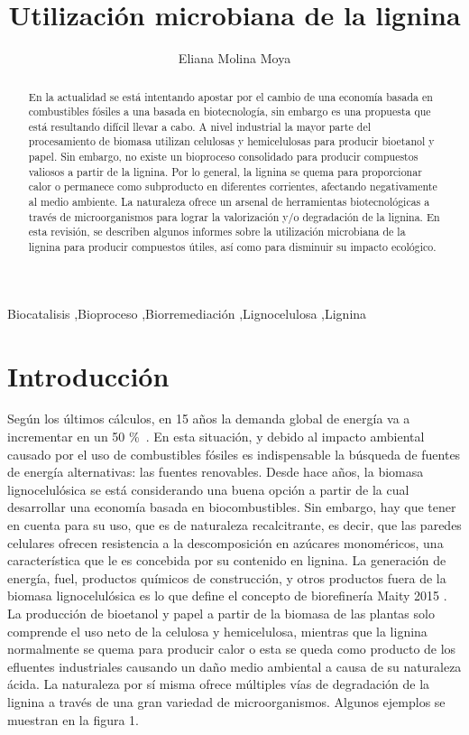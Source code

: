 \documentclass[final,a4paper,times,3p,onecolumn]{elsarticle}
\begin{document}
\begin{frontmatter}	
\title{Utilización microbiana de la lignina}
\author[deg]{Eliana Molina Moya}
\address[deg]{Universidad de Granada}

\begin{abstract}

En la actualidad se está intentando apostar por el cambio de una economía basada en combustibles fósiles a una basada en biotecnología, sin embargo es una propuesta que está resultando difícil llevar a cabo. A nivel industrial la mayor parte del procesamiento de biomasa utilizan celulosas y hemicelulosas para producir bioetanol y papel. Sin embargo, no existe un bioproceso consolidado para producir compuestos valiosos a partir de la lignina. Por lo general, la lignina se quema para proporcionar calor o permanece como subproducto en diferentes corrientes, afectando negativamente al medio ambiente.  La naturaleza ofrece un arsenal de herramientas biotecnológicas a través de microorganismos para lograr la valorización y/o degradación de la lignina. En esta revisión, se describen algunos informes sobre la utilización microbiana de la lignina para producir compuestos útiles, así como para disminuir su impacto ecológico. 
\end{abstract}	

\begin{keyword}
Biocatalisis \sep Bioproceso \sep Biorremediación \sep Lignocelulosa \sep Lignina 
\end{keyword}
\end{frontmatter}

\section{Introducción}

Según los últimos cálculos, en 15 años la demanda global de energía va a incrementar en un 50 \% \,\cite{McCann2015}. En esta situación, y debido al impacto ambiental causado por el uso de combustibles fósiles es indispensable la búsqueda de fuentes de energía alternativas: las fuentes renovables. Desde hace años, la biomasa lignocelulósica se está considerando una buena opción a partir de la cual desarrollar una economía basada en biocombustibles. Sin embargo, hay que tener en cuenta para su uso, que es de naturaleza recalcitrante, es decir,  que las paredes celulares ofrecen resistencia a la descomposición en azúcares monoméricos, una característica que le es concebida por su contenido en lignina. La generación de energía, fuel, productos químicos de construcción, y otros productos fuera de la biomasa lignocelulósica es lo que define el concepto de biorefinería Maity 2015 . La producción de bioetanol y papel a partir de la biomasa de las plantas solo comprende el uso neto de la celulosa y hemicelulosa, mientras que la lignina normalmente se quema para producir calor o esta se queda como producto de los efluentes industriales causando un daño medio ambiental a causa de su naturaleza ácida. La naturaleza por sí misma ofrece múltiples vías de degradación de la lignina a través de una gran variedad de microorganismos. Algunos ejemplos se muestran en la figura 1.
\end{document}
